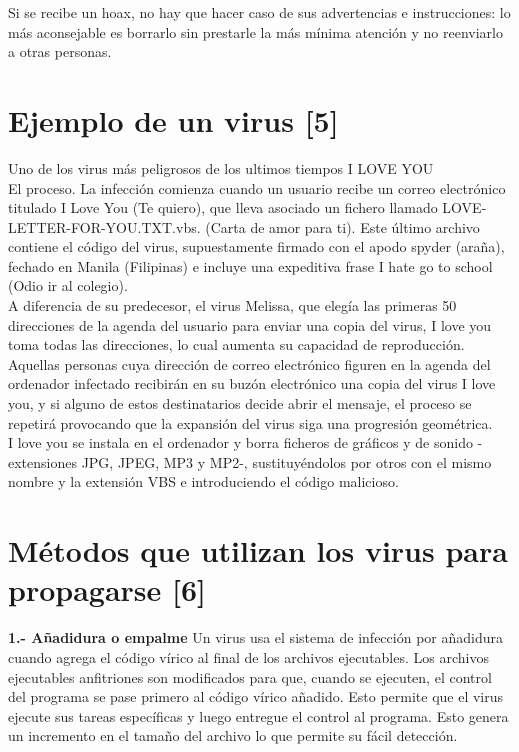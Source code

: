 \documentclass[12pt,a4paper]{article}
\begin{document}
	Si se recibe un hoax, no hay que hacer caso de sus advertencias e instrucciones: lo más aconsejable es borrarlo sin prestarle la más mínima atención y no reenviarlo a otras personas.
	
	\section{Ejemplo de un virus [5]}
	
	Uno de los virus más peligrosos de los ultimos tiempos I LOVE YOU\\
	
	El proceso. La infección comienza cuando un usuario recibe un correo electrónico titulado I Love You (Te quiero), que lleva asociado un fichero llamado LOVE-LETTER-FOR-YOU.TXT.vbs. (Carta de amor para ti). Este último archivo contiene el código del virus, supuestamente firmado con el apodo spyder (araña), fechado en Manila (Filipinas) e incluye una expeditiva frase I hate go to school (Odio ir al colegio).\\
	
	A diferencia de su predecesor, el virus Melissa, que elegía las primeras 50 direcciones de la agenda del usuario para enviar una copia del virus, I love you toma todas las direcciones, lo cual aumenta su capacidad de reproducción.\\
	
	Aquellas personas cuya dirección de correo electrónico figuren en la agenda del ordenador infectado recibirán en su buzón electrónico una copia del virus I love you, y si alguno de estos destinatarios decide abrir el mensaje, el proceso se repetirá provocando que la expansión del virus siga una progresión geométrica.\\
	
	I love you se instala en el ordenador y borra ficheros de gráficos y de sonido -extensiones JPG, JPEG, MP3 y MP2-, sustituyéndolos por otros con el mismo nombre y la extensión VBS e introduciendo el código malicioso.
	
	\section{Métodos que utilizan los virus para propagarse [6]}
	
	\textbf{1.- Añadidura o empalme}
	Un virus usa el sistema de infección por añadidura cuando agrega el código vírico al final de los archivos ejecutables. Los archivos ejecutables anfitriones son modificados para que, cuando se ejecuten, el control del programa se pase primero al código vírico añadido. Esto permite que el virus ejecute sus tareas específicas y luego entregue el control al programa. Esto genera un incremento en el tamaño del archivo lo que permite su fácil detección.\\
	
\end{document}
